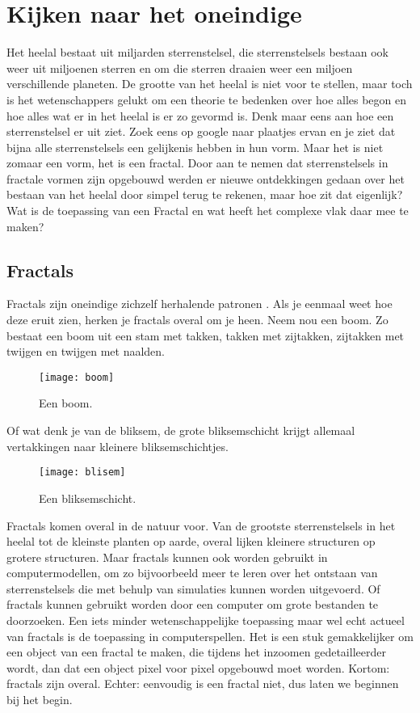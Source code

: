 \documentclass[11pt,fleqn]{book} %
\begin{document}
\chapter{Kijken naar het oneindige}
Het heelal bestaat uit miljarden sterrenstelsel, die sterrenstelsels bestaan ook weer uit miljoenen sterren en om die sterren draaien weer een miljoen verschillende planeten. De grootte van het heelal is niet voor te stellen, maar toch is het wetenschappers gelukt om een theorie te bedenken over hoe alles begon en hoe alles wat er in het heelal is er zo gevormd is. Denk maar eens aan hoe een sterrenstelsel er uit ziet. Zoek eens op google naar plaatjes ervan en je ziet dat bijna alle sterrenstelsels een gelijkenis hebben in hun vorm. Maar het is niet zomaar een vorm, het is een fractal. Door aan te nemen dat sterrenstelsels in fractale vormen zijn opgebouwd werden er nieuwe ontdekkingen gedaan over het bestaan van het heelal door simpel terug te rekenen, maar hoe zit dat eigenlijk? Wat is de toepassing van een Fractal en wat heeft het complexe vlak daar mee te maken?

\section{Fractals}
Fractals zijn oneindige zichzelf herhalende patronen \cite{whatarefrac}. Als je eenmaal weet hoe deze eruit zien, herken je fractals overal om je heen. 
Neem nou een boom. Zo bestaat een boom uit een stam met takken, takken met zijtakken, zijtakken met twijgen en twijgen met naalden.
\begin{figure}[h]
	\centering\texttt{[image: boom]}
	\caption{Een boom.}
	\label{fig:boom}
\end{figure}
Of wat denk je van de bliksem, de grote bliksemschicht krijgt allemaal vertakkingen naar kleinere bliksemschichtjes.
\begin{figure}[h]
	\centering\texttt{[image: blisem]}
	\caption{Een bliksemschicht.}
	\label{fig:bliksem}
\end{figure}

Fractals komen overal in de natuur voor. Van de grootste sterrenstelsels in het heelal tot de kleinste planten op aarde, overal lijken kleinere structuren op grotere structuren. Maar fractals kunnen ook worden gebruikt in computermodellen, om zo bijvoorbeeld meer te leren over het ontstaan van sterrenstelsels die met behulp van simulaties kunnen worden uitgevoerd. Of fractals kunnen gebruikt worden door een computer om grote bestanden te doorzoeken. Een iets minder wetenschappelijke toepassing maar wel echt actueel van fractals is de toepassing in computerspellen. Het is een stuk gemakkelijker om een object van een fractal te maken, die tijdens het inzoomen gedetailleerder wordt, dan dat een object pixel voor pixel opgebouwd moet worden. Kortom: fractals zijn overal. Echter: eenvoudig is een fractal niet, dus laten we beginnen bij het begin.
\end{document}
